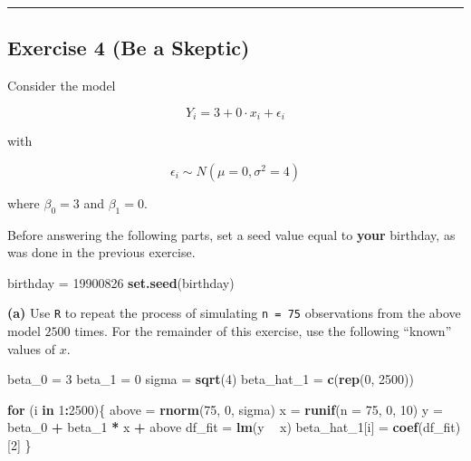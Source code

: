 \documentclass[]{article}
\newenvironment{Shaded}{\begin{snugshade}}{\end{snugshade}}
\newcommand{\ControlFlowTok}[1]{\textcolor[rgb]{0.13,0.29,0.53}{\textbf{#1}}}
\newcommand{\DataTypeTok}[1]{\textcolor[rgb]{0.13,0.29,0.53}{#1}}
\newcommand{\DecValTok}[1]{\textcolor[rgb]{0.00,0.00,0.81}{#1}}
\newcommand{\KeywordTok}[1]{\textcolor[rgb]{0.13,0.29,0.53}{\textbf{#1}}}
\newcommand{\NormalTok}[1]{#1}
\newcommand{\OperatorTok}[1]{\textcolor[rgb]{0.81,0.36,0.00}{\textbf{#1}}}
\newcommand{\StringTok}[1]{\textcolor[rgb]{0.31,0.60,0.02}{#1}}
\begin{document}
\begin{center}\rule{0.5\linewidth}{0.5pt}\end{center}

\hypertarget{exercise-4-be-a-skeptic}{%
\subsection{Exercise 4 (Be a Skeptic)}\label{exercise-4-be-a-skeptic}}

Consider the model

\[
Y_i = 3 + 0 \cdot x_i + \epsilon_i
\]

with

\[
\epsilon_i \sim N(\mu = 0, \sigma^2 = 4)
\]

where \(\beta_0 = 3\) and \(\beta_1 = 0\).

Before answering the following parts, set a seed value equal to
\textbf{your} birthday, as was done in the previous exercise.

\begin{Shaded}
\begin{Highlighting}[]
\NormalTok{birthday =}\StringTok{ }\DecValTok{19900826}
\KeywordTok{set.seed}\NormalTok{(birthday)}
\end{Highlighting}
\end{Shaded}

\textbf{(a)} Use \texttt{R} to repeat the process of simulating
\texttt{n\ =\ 75} observations from the above model \(2500\) times. For
the remainder of this exercise, use the following ``known'' values of
\(x\).

\begin{Shaded}
\begin{Highlighting}[]
\NormalTok{beta_}\DecValTok{0}\NormalTok{ =}\StringTok{ }\DecValTok{3}
\NormalTok{beta_}\DecValTok{1}\NormalTok{ =}\StringTok{ }\DecValTok{0}
\NormalTok{sigma =}\StringTok{ }\KeywordTok{sqrt}\NormalTok{(}\DecValTok{4}\NormalTok{)}
\NormalTok{beta_hat_}\DecValTok{1}\NormalTok{ =}\StringTok{ }\KeywordTok{c}\NormalTok{(}\KeywordTok{rep}\NormalTok{(}\DecValTok{0}\NormalTok{, }\DecValTok{2500}\NormalTok{))}

\ControlFlowTok{for}\NormalTok{ (i }\ControlFlowTok{in} \DecValTok{1}\OperatorTok{:}\DecValTok{2500}\NormalTok{)\{}
\NormalTok{  above =}\StringTok{ }\KeywordTok{rnorm}\NormalTok{(}\DecValTok{75}\NormalTok{, }\DecValTok{0}\NormalTok{, sigma)}
\NormalTok{  x =}\StringTok{ }\KeywordTok{runif}\NormalTok{(}\DataTypeTok{n =} \DecValTok{75}\NormalTok{, }\DecValTok{0}\NormalTok{, }\DecValTok{10}\NormalTok{)}
\NormalTok{  y =}\StringTok{ }\NormalTok{beta_}\DecValTok{0} \OperatorTok{+}\StringTok{ }\NormalTok{beta_}\DecValTok{1} \OperatorTok{*}\StringTok{ }\NormalTok{x }\OperatorTok{+}\StringTok{ }\NormalTok{above}
\NormalTok{  df_fit =}\StringTok{ }\KeywordTok{lm}\NormalTok{(y }\OperatorTok{~}\StringTok{ }\NormalTok{x)}
\NormalTok{  beta_hat_}\DecValTok{1}\NormalTok{[i] =}\StringTok{ }\KeywordTok{coef}\NormalTok{(df_fit)[}\DecValTok{2}\NormalTok{]}
\NormalTok{\}}
\end{Highlighting}
\end{Shaded}
\end{document}
